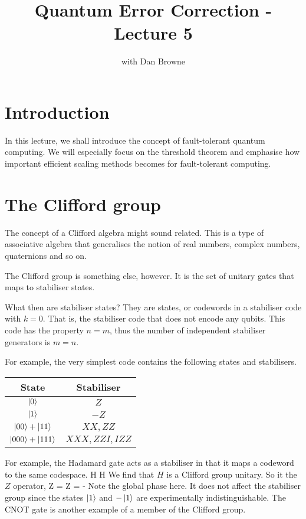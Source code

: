 


\title{Quantum Error Correction - Lecture 5}
\author{with Dan Browne}
\maketitle
\tableofcontents

\section{Introduction} 
In this lecture, we shall introduce the concept of fault-tolerant quantum computing. We will especially focus on the threshold theorem and emphasise how important efficient scaling methods becomes for fault-tolerant computing. 

\section{The Clifford group}
The concept of a Clifford algebra might sound related. This is a type of associative algebra that generalises the notion of real numbers, complex numbers, quaternions and so on. 

The Clifford group is something else, however. It is the set of unitary gates that maps to stabiliser states. 

What then are stabiliser states? They are states, or codewords in a stabiliser code with $k = 0$. That is, the stabiliser code that does not encode any qubits. This code has the property $n = m$, thus the number of independent stabiliser generators is $m = n$. 

For example, the very simplest code contains the following states and stabilisers. 

\begin{tabular}{ c c}
\hline 
State & Stabiliser \\ \hline
$\ket{0}$ & $Z$ \\ 
$\ket{1}$ & $- Z$ \\ 
$\ket{00} + \ket{11}$ & $XX, ZZ$ \\ 
$\ket{000} + \ket{111}$ & $XXX, ZZI, IZZ$ \\ 
\end{tabular}

For example, the Hadamard gate acts as a stabiliser in that it maps a codeword to the same codespace. 
\beq
H  \rightarrow \ket{+}
\eeq
\beq
H  \rightarrow \ket{-}
\eeq
We find that $H$ is a Clifford group unitary. So it the $Z$ operator, 
\beq
Z  = 
\eeq
\beq
Z  = - 
\eeq
Note the global phase here. It does not affect the stabiliser group since the states $\ket{1}$ and $-\ket{1}$ are experimentally indistinguishable. 
The CNOT gate is another example of a member of the Clifford group. 

